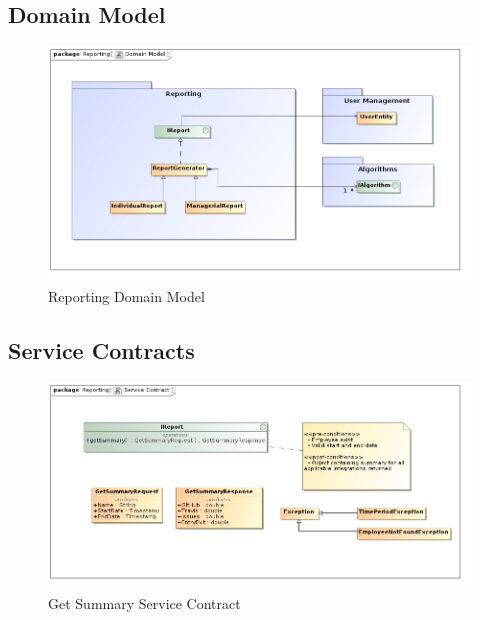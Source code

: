 \documentclass[11pt,a4paper]{article}
\begin{document}
\subsection{Domain Model}
\begin{figure}[H]
	\begin{center}
		\includegraphics[scale=0.45]{../Images/Reporting Domain Model.jpg}
		\caption{Reporting Domain Model}
		\centering
	\end{center}
\end{figure}

\subsection{Service Contracts}
\begin{figure}[h!]
	\begin{center}
		\includegraphics[width=\linewidth]{../Images/GetSummary Service Contract.jpg}
		\caption{Get Summary Service Contract}
	\end{center}
\end{figure}
\end{document}
